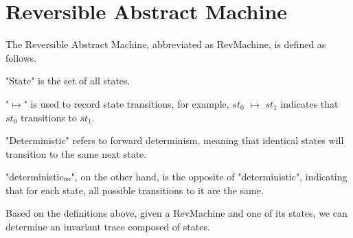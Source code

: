\section{Reversible Abstract Machine}

The Reversible Abstract Machine, abbreviated as RevMachine, is defined as follows.



"State" is the set of all states.

"$\mapsto$" is used to record state transitions, for example, $st_{0}$ $\mapsto$ $st_{1}$ indicates that $st_{0}$ transitions to $st_{1}$.

"Deterministic" refers to forward determinism, meaning that identical states will transition to the same next state.

"deterministicᵣₑᵥ", on the other hand, is the opposite of "deterministic", indicating that for each state, all possible transitions to it are the same.

Based on the definitions above, given a RevMachine and one of its states, we can determine an invariant trace composed of states.

